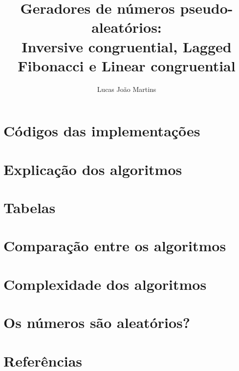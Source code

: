 \documentclass[12pt]{article}
\title{
  Geradores de números pseudo-aleatórios: \\
  \large Inversive congruential, Lagged Fibonacci e Linear congruential}
\author{Lucas João Martins}
\date{}
\begin{document}
\maketitle

\section{Códigos das implementações}





\section{Explicação dos algoritmos}

\section{Tabelas}

\section{Comparação entre os algoritmos}

\section{Complexidade dos algoritmos}

\section{Os números são aleatórios?}

\section{Referências}
\end{document}
